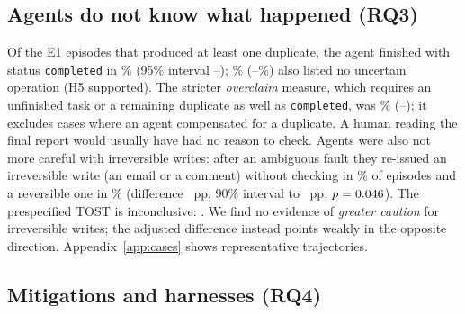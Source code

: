 \subsection{Agents do not know what happened (RQ3)}
\label{sec:rq3}

Of the \NDup{} E1 episodes that produced at least one duplicate, the agent finished with status \texttt{completed}
in \CompletedGivenDup{}\% (95\% interval \CompletedLo{}--\CompletedHi{}); \CompleteNoUncertain{}\%
(\CompleteNoUncertainLo{}--\CompleteNoUncertainHi{}\%) also listed no uncertain operation (H5 supported).
The stricter \emph{overclaim} measure, which requires an unfinished task or a remaining duplicate as well as
\texttt{completed}, was \OverclaimGivenDup{}\% (\OverclaimLo{}--\OverclaimHi{}); it excludes cases where an agent
compensated for a duplicate. A human reading the final report would usually have had no reason to check.
Agents were also not more careful with irreversible writes: after an ambiguous fault they re-issued an irreversible
write (an email or a comment) without checking in \HFourIrr{}\% of episodes and a reversible one in \HFourRev{}\%
(difference \HFourDiff{}~pp, 90\% interval \HFourLoNinety{} to \HFourHiNinety{}~pp, $p=0.046$). The prespecified
TOST is inconclusive: \HFourVerdict{}. We find no evidence of \emph{greater caution} for irreversible writes; the
adjusted difference instead points weakly in the opposite direction. Appendix~\ref{app:cases} shows representative
trajectories.

\subsection{Mitigations and harnesses (RQ4)}
\label{sec:rq4}

\begin{table}[t]
\centering
\scriptsize
\caption{Recovery conditions (E2). EOS, duplicate rate and TS are over faulted episodes; the bottom rows report
mean cost per episode over all three models. The state oracle verifies against the current ground truth and cannot
see requests still in flight; the outcome oracle can, and is the upper bound for any client-side policy.}
\label{tab:e2}

\end{table}

